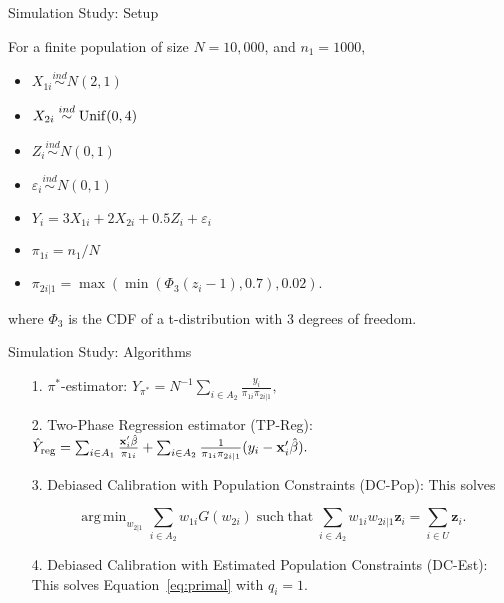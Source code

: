\documentclass{beamer} %
\DeclareMathOperator*{\argmin}{arg\,min}
\DeclareMathOperator*{\suchthat}{such\; that}
\renewcommand{\bf}[1]{\mathbf{#1}}
\begin{document}
\begin{frame}{Simulation Study: Setup}

  For a finite population of size $N = 10,000$, and $n_1 = 1000$,

  \begin{itemize}
    \item $X_{1i} \stackrel{ind}{\sim} N(2, 1)$
    \item $X_{2i} \stackrel{ind}{\sim} \rm{Unif}(0, 4)$
    \item $Z_{i} \stackrel{ind}{\sim} N(0, 1)$
    \item $\varepsilon_i \stackrel{ind}{\sim} N(0, 1)$
    \item $Y_{i} = 3 X_{1i} + 2 X_{2i} + 0.5 Z_i + \varepsilon_i$
    \item $\pi_{1i} = n_1 / N$
    \item $\pi_{2i|1} = \max(\min(\Phi_3(z_{i} - 1), 0.7), 0.02)$.
    \end{itemize}

where $\Phi_3$ is the CDF of a t-distribution with 3 degrees of freedom.

\end{frame}

\begin{frame}{Simulation Study: Algorithms}

\begin{itemize}
  \item[1.] $\pi^*$-estimator: $\hat Y_{\pi^*} = N^{-1} \sum_{i \in A_2}
    \frac{y_i}{\pi_{1i} \pi_{2i|1}},$
  \item[2.] Two-Phase Regression estimator (TP-Reg): 
    $\hat Y_{\rm{reg}} = \sum_{i \in A_1} \frac{\bf x_i' \hat \beta}{\pi_{1i}} + 
    \sum_{i \in A_2} \frac{1}{\pi_{1i}\pi_{2i|1}}(y_i - \bf x_i' \hat \beta).$ 
  \item[3.] Debiased Calibration with Population Constraints (DC-Pop): This 
    solves 

  \begin{equation*}
    \argmin_{w_{2|1}} \sum_{i \in A_2} w_{1i} G(w_{2i}) \suchthat
    \sum_{i \in A_2} w_{1i} w_{2i|1} \bf z_i = \sum_{i \in U} \bf z_i.
  \end{equation*}

  \item[4.] Debiased Calibration with Estimated Population Constraints (DC-Est):
    This solves Equation~\eqref{eq:primal} with $q_i = 1$.
\end{itemize}

\end{frame}
\end{document}
